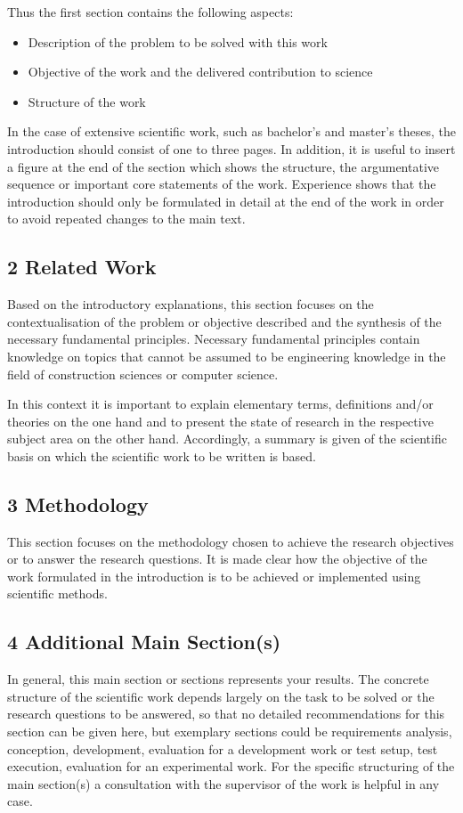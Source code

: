 Thus the first section contains the following aspects:

\begin{itemize}
	\item Description of the problem to be solved with this work
	\item Objective of the work and the delivered contribution to science
	\item Structure of the work
\end{itemize}

In the case of extensive scientific work, such as bachelor's and master's theses, the introduction should consist of one to three pages. In addition, it is useful to insert a figure at the end of the section which shows the structure, the argumentative sequence or important core statements of the work. Experience shows that the introduction should only be formulated in detail at the end of the work in order to avoid repeated changes to the main text.

\subsection*{2 Related Work}
Based on the introductory explanations, this section focuses on the contextualisation of the problem or objective described and the synthesis of the necessary fundamental principles. Necessary fundamental principles contain knowledge on topics that cannot be assumed to be engineering knowledge in the field of construction sciences or computer science.

In this context it is important to explain elementary terms, definitions and/or theories on the one hand and to present the state of research in the respective subject area on the other hand.
Accordingly, a summary is given of the scientific basis on which the scientific work to be written is based.

\subsection*{3 Methodology}
This section focuses on the methodology chosen to achieve the research objectives or to answer the research questions. It is made clear how the objective of the work formulated in the introduction is to be achieved or implemented using scientific methods.

\subsection*{4 Additional Main Section(s)}
In general, this main section or sections represents your results. The concrete structure of the scientific work depends largely on the task to be solved or the research questions to be answered, so that no detailed recommendations for this section can be given here, but exemplary sections could be requirements analysis, conception, development, evaluation for a development work or test setup, test execution, evaluation for an experimental work. For the specific structuring of the main section(s) a consultation with the supervisor of the work is helpful in any case.

